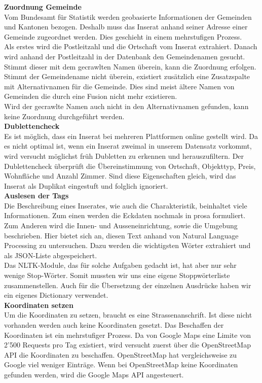 \textbf{Zuordnung Gemeinde}\\
Vom Bundesamt für Statistik werden geobasierte Informationen der Gemeinden und Kantonen bezogen. Deshalb muss das Inserat anhand seiner Adresse einer Gemeinde zugeordnet werden. Dies geschieht in einem mehrstufigen Prozess.\\
Als erstes wird die Postleitzahl und die Ortschaft vom Inserat extrahiert. Danach wird anhand der Postleitzahl in der Datenbank den Gemeindenamen gesucht. Stimmt dieser mit dem gecrawlten Namen überein, kann die Zuordnung erfolgen.\\
Stimmt der Gemeindename nicht überein, existiert zusätzlich eine Zusatzspalte mit Alternativnamen für die Gemeinde.  Dies sind meist ältere Namen von Gemeinden die durch eine Fusion nicht mehr existieren.\\
Wird der gecrawlte Namen auch nicht in den Alternativnamen gefunden, kann keine Zuordnung durchgeführt werden.\\[2ex]
%
\textbf{Dublettencheck}\\
Es ist möglich, dass ein Inserat bei mehreren Plattformen online gestellt wird. Da es nicht optimal ist, wenn ein Inserat zweimal in unserem Datensatz vorkommt, wird versucht möglichst früh Dubletten zu erkennen und herauszufiltern. Der Dublettencheck überprüft die Übereinstimmung von Ortschaft, Objekttyp, Preis, Wohnfläche und Anzahl Zimmer. Sind diese Eigenschaften gleich, wird das Inserat als Duplikat eingestuft und folglich ignoriert.\\[2ex]
%
\textbf{Auslesen der Tags}\\
Die Beschreibung eines Inserates, wie auch die Charakteristik, beinhaltet viele Informationen. Zum einen werden die Eckdaten nochmals in prosa formuliert. Zum Anderen wird die Innen- und Ausseneinrichtung, sowie die Umgebung beschrieben. Hier bietet sich an, diesen Text anhand von Natural Language Processing zu untersuchen. Dazu werden die wichtigsten Wörter extrahiert und als JSON-Liste abgespeichert.\\
Das NLTK-Module, das für solche Aufgaben gedacht ist, hat aber nur sehr wenige Stop-Wörter. Somit mussten wir uns eine eigene Stoppwörterliste zusammenstellen. Auch für die Übersetzung der einzelnen Ausdrücke haben wir ein eigenes Dictionary verwendet.\\[2ex]
%
\textbf{Koordinaten setzen}\\
Um die Koordinaten zu setzen, braucht es eine Strassenanschrift. Ist diese nicht vorhanden werden auch keine Koordinaten gesetzt. Das Beschaffen der Koordinaten ist ein mehrstufiger Prozess. Da von Google Maps eine Limite von 2'500 Requests pro Tag existiert, wird versucht zuerst über die OpenStreetMap API die Koordinaten zu beschaffen. OpenStreetMap hat vergleichsweise zu Google viel weniger Einträge. Wenn bei OpenStreetMap keine Koordinaten gefunden werden, wird die Google Maps API angesteuert.\\[2ex]
